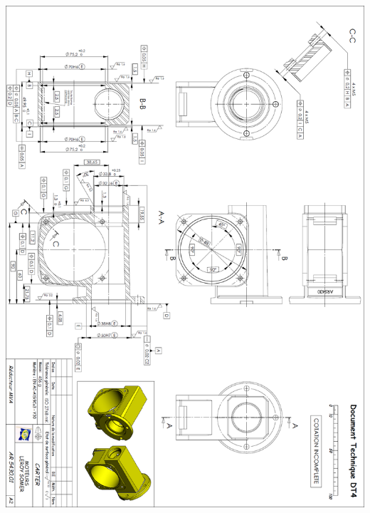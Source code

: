 \documentclass[10pt,fleqn]{article} %
\begin{document}
\begin{center}
\includegraphics[width=\textwidth]{images/reducteur_03}
\end{center}
\end{document}
